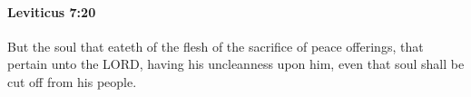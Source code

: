 
		\paragraph{Leviticus 7:20} %
			\label{LEVITICUS-7-20}

			But the soul that eateth of the flesh of the sacrifice of peace offerings, that pertain unto the LORD, having his uncleanness upon him, even that soul shall be cut off from his people.


